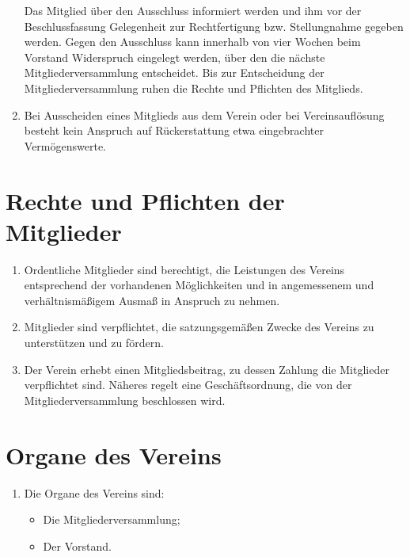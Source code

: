 \documentclass[fontsize=12pt,paper=a4,pagesize,headings=small]{scrartcl}
\begin{document}
\begin{enumerate}
    Das Mitglied über den Ausschluss informiert werden und ihm vor der
    Beschlussfassung Gelegenheit zur Rechtfertigung bzw. Stellungnahme
    gegeben werden. Gegen den Ausschluss kann innerhalb von vier Wochen
    beim Vorstand Widerspruch eingelegt werden, über den die nächste
    Mitgliederversammlung entscheidet. Bis zur Entscheidung der
    Mitgliederversammlung ruhen die Rechte und Pflichten des Mitglieds.

    \item Bei Ausscheiden eines Mitglieds aus dem Verein oder bei
    Vereinsauflösung besteht kein Anspruch auf Rückerstattung etwa
    eingebrachter Vermögenswerte.
\end{enumerate}

\section{Rechte und Pflichten der Mitglieder}

\begin{enumerate}
    \item Ordentliche Mitglieder sind berechtigt, die Leistungen des
        Vereins entsprechend der vorhandenen Möglichkeiten und in angemessenem und verhältnismäßigem Ausmaß in Anspruch zu nehmen.

    \item Mitglieder sind verpflichtet, die satzungsgemäßen Zwecke des
        Vereins zu unterstützen und zu fördern.

    \item Der Verein erhebt einen Mitgliedsbeitrag, zu dessen Zahlung die
        Mitglieder verpflichtet sind. Näheres regelt eine Geschäftsordnung,
        die von der Mitgliederversammlung beschlossen wird.
\end{enumerate}

\section{Organe des Vereins}
\begin{enumerate}
    \item Die Organe des Vereins sind:
        \begin{itemize}
            \item Die Mitgliederversammlung;
            \item Der Vorstand.
        \end{itemize}
\end{enumerate}
\end{document}
